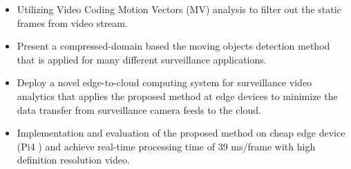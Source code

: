 \begin{itemize}
\item Utilizing Video Coding Motion Vectors (MV) analysis to filter out the static frames from video stream.
\item Present a compressed-domain based the moving objects detection method that is applied for many different surveillance applications.
\item Deploy a novel edge-to-cloud computing system for surveillance video analytics that applies the proposed method at edge devices to minimize the data transfer from surveillance camera feeds to the cloud.
\item Implementation and evaluation of the proposed method on cheap edge device (Pi4 ) and achieve real-time processing time of  39 ms/frame with high definition resolution video.
\end{itemize}
%
%
